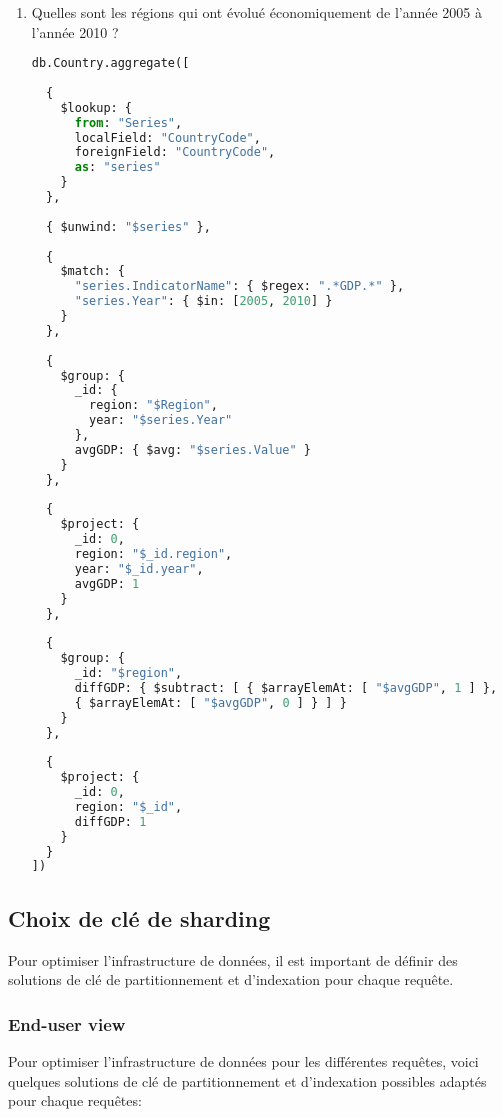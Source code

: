 \begin{enumerate}
\begin{lstlisting}[language=Python]
\end{lstlisting}    
    \item Quelles sont les régions qui ont évolué économiquement de l’année 2005 à l’année 2010 ?
\begin{lstlisting}[language=Python]
db.Country.aggregate([
  
  {
    $lookup: {
      from: "Series",
      localField: "CountryCode",
      foreignField: "CountryCode",
      as: "series"
    }
  },
  
  { $unwind: "$series" },
  
  {
    $match: {
      "series.IndicatorName": { $regex: ".*GDP.*" },
      "series.Year": { $in: [2005, 2010] }
    }
  },
  
  {
    $group: {
      _id: {
        region: "$Region",
        year: "$series.Year"
      },
      avgGDP: { $avg: "$series.Value" }
    }
  },
  
  {
    $project: {
      _id: 0,
      region: "$_id.region",
      year: "$_id.year",
      avgGDP: 1
    }
  },
 
  {
    $group: {
      _id: "$region",
      diffGDP: { $subtract: [ { $arrayElemAt: [ "$avgGDP", 1 ] }, 
      { $arrayElemAt: [ "$avgGDP", 0 ] } ] }
    }
  },
  
  {
    $project: {
      _id: 0,
      region: "$_id",
      diffGDP: 1
    }
  }
])

\end{lstlisting}
\end{enumerate}

\subsection{Choix de clé de sharding}
Pour optimiser l'infrastructure de données, il est important de définir des solutions de clé de partitionnement et d'indexation pour chaque requête.
\subsubsection{End-user view}
Pour optimiser l’infrastructure de données pour les différentes requêtes, voici quelques solutions de clé de partitionnement et d’indexation possibles adaptés pour chaque requêtes:

